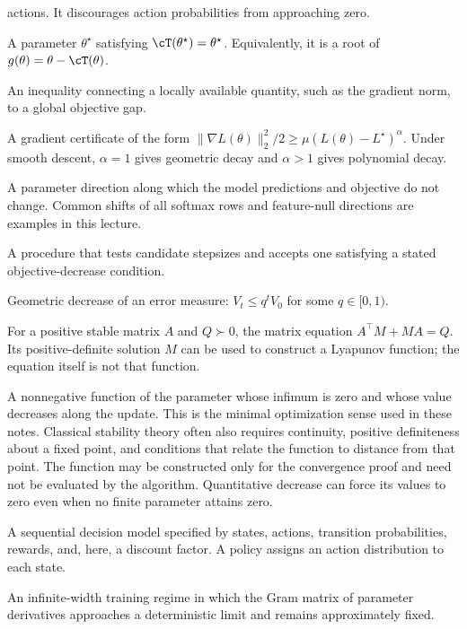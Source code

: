 \documentclass[11pt,twoside]{article}
\theoremstyle{definition}
\theoremstyle{remark}
\begin{document}
\begin{description}[style=nextline,leftmargin=1.5em,labelindent=0pt]
actions. It discourages action probabilities from approaching zero.
\item[Fixed point]
A parameter $\theta^\star$ satisfying
$\cT(\theta^\star)=\theta^\star$. Equivalently, it is a root of
$g(\theta)=\theta-\cT(\theta)$.
\item[Gradient certificate]
An inequality connecting a locally available quantity, such as the gradient
norm, to a global objective gap.
\item[Gradient dominance]
A gradient certificate of the form
$\|\nabla L(\theta)\|_2^2/2
\ge\mu(L(\theta)-L^\star)^\alpha$. Under smooth descent, $\alpha=1$ gives
geometric decay and $\alpha>1$ gives polynomial decay.
\item[Invariant parameter direction]
A parameter direction along which the model predictions and objective do not
change. Common shifts of all softmax rows and feature-null directions are
examples in this lecture.
\item[Line search]
A procedure that tests candidate stepsizes and accepts one satisfying a stated
objective-decrease condition.
\item[Linear convergence]
Geometric decrease of an error measure: $V_t\le q^tV_0$ for some
$q\in[0,1)$.
\item[Lyapunov equation]
For a positive stable matrix $A$ and $Q\succ0$, the matrix equation
$A^\top M+MA=Q$. Its positive-definite solution $M$ can be used to construct a
Lyapunov function; the equation itself is not that function.
\item[Lyapunov function]
A nonnegative function of the parameter whose infimum is zero and whose value
decreases along the update. This is the minimal optimization sense used in
these notes. Classical stability theory often also requires continuity,
positive definiteness about a fixed point, and conditions that relate the
function to distance from that point. The function may be constructed only
for the convergence proof and need not be evaluated by the algorithm.
Quantitative decrease can force its values to zero even when no finite
parameter attains zero.
\item[Markov decision process (MDP)]
A sequential decision model specified by states, actions, transition
probabilities, rewards, and, here, a discount factor. A policy assigns an
action distribution to each state.
\item[Neural tangent kernel (NTK) regime]
An infinite-width training regime in which the Gram matrix of parameter
derivatives approaches a deterministic limit and remains approximately fixed.

\end{description}
\end{document}
